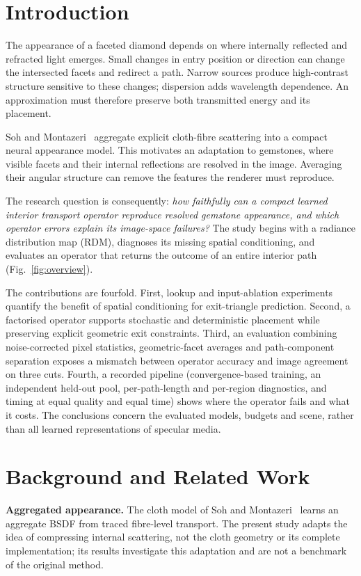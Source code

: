 \documentclass[conference]{IEEEtran}
\begin{document}
\section{Introduction}
The appearance of a faceted diamond depends on where internally reflected and
refracted light emerges. Small changes in entry position or direction can
change the intersected facets and redirect a path. Narrow sources produce
high-contrast structure sensitive to these changes; dispersion adds wavelength
dependence. An approximation must therefore preserve both transmitted energy
and its placement.

Soh and Montazeri~\cite{soh2024} aggregate explicit cloth-fibre scattering into
a compact neural appearance model. This motivates an adaptation to gemstones,
where visible facets and their internal reflections are resolved in the image.
Averaging their angular structure can remove the features the renderer must
reproduce.

The research question is consequently: \emph{how faithfully can a compact
learned interior transport operator reproduce resolved gemstone appearance, and
which operator errors explain its image-space failures?} The study begins with
a radiance distribution map (RDM), diagnoses its missing spatial conditioning,
and evaluates an operator that returns the outcome of an entire interior path
(Fig.~\ref{fig:overview}).

The contributions are fourfold. First, lookup and input-ablation experiments
quantify the benefit of spatial conditioning for exit-triangle prediction.
Second, a factorised operator supports stochastic and deterministic placement
while preserving explicit geometric exit constraints. Third, an evaluation
combining noise-corrected pixel statistics, geometric-facet averages and
path-component separation exposes a mismatch between operator accuracy and
image agreement on three cuts. Fourth, a recorded pipeline (convergence-based
training, an independent held-out pool, per-path-length and per-region
diagnostics, and timing at equal quality and equal time) shows where the
operator fails and what it costs. The conclusions concern the evaluated models,
budgets and scene, rather than all learned representations of specular media.

\section{Background and Related Work}
\textbf{Aggregated appearance.} The cloth model of Soh and
Montazeri~\cite{soh2024} learns an aggregate BSDF from traced fibre-level
transport. The present study adapts the idea of compressing internal
scattering, not the cloth geometry or its complete implementation; its results
investigate this adaptation and are not a benchmark of the original method.
\end{document}
